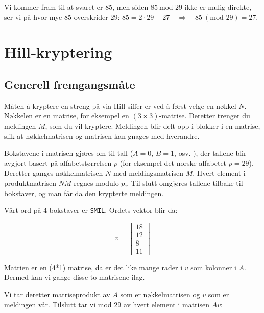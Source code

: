 \documentclass[12pt,a4paper]{article}
\begin{document}
Vi kommer fram til at svaret er $85$, men siden $85\ \text{mod }29$ ikke er
mulig direkte, ser vi på hvor mye $85$ overskrider $29$:
$
85 = 2\cdot 29 + 27 \quad\Longrightarrow\quad 85\ (\text{mod }29)=27 .
$

\newpage
\section{Hill‑kryptering}
\subsection{ Generell fremgangsmåte}

\vspace{2mm}

Måten å kryptere en streng på via Hill‑siffer er ved å først velge en nøkkel
$N$. Nøkkelen er en matrise, for eksempel en $(3\times3)$‑matrise.
Deretter trenger du meldingen $M$, som du vil kryptere. Meldingen blir delt opp
i blokker i en matrise, slik at nøkkelmatrisen og matrisen kan gnages med hverandre.


Bokstavene i matrisen gjøres om til tall ($A=0$, $B=1$, osv. ), der tallene blir avgjort basert på alfabetstørrelsen  $p$ (for eksempel det norske alfabetet $p=29$). Deretter ganges nøkkelmatrisen $N$ med meldingsmatrisen $M$. Hvert element i produktmatrisen $NM$ regnes modulo $p$,. Til slutt omgjøres tallene tilbake til bokstaver, og man får da den krypterte meldingen.

\vspace{6mm}
Vårt ord på $4$ bokstaver er \texttt{SMIL}. Ordets vektor blir da:


\[ v = \begin{bmatrix} 18\\ 12\\ 8\\ 11 \end{bmatrix} \]

\vspace{6mm}
Matrien er en (4*1) matrise, da er det like mange rader i $v$ som kolonner i $A$. Dermed kan vi gange disse to matrisene ilag.

\vspace{6mm}

 Vi tar deretter matriseprodukt av $A$ som er nøkkelmatrisen og $v$ som er meldingen vår. Tilslutt tar vi mod 29 av hvert element i matrisen $Av$:
\end{document}
